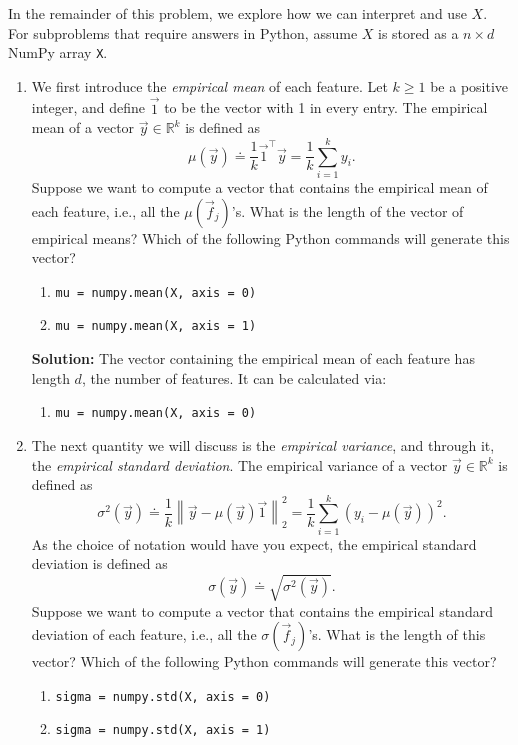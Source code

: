 \documentclass[10pt]{article}
\theoremstyle{definition}
\theoremstyle{plain}
\newcommand{\RR}{\mathbb{R}}
\begin{document}
In the remainder of this problem, we explore how we can interpret and use $X$. For subproblems that require answers in Python, assume $X$ is stored as a $n \times d$ NumPy array \texttt{X}.

\begin{enumerate}[label=(\alph*)]
\item We first introduce the \textit{empirical mean} of each feature. Let $k \geq 1$ be a positive integer, and define $\vec{1}$ to be the vector with 1 in every entry. The empirical mean of a vector $\vec{y} \in \RR^k$ is defined as
\begin{equation}
\mu(\vec{y}) \doteq \frac{1}{k} \vec{1}^\top \vec{y} = \frac{1}{k} \sum_{i=1}^{k} y_i.
\end{equation}
Suppose we want to compute a vector that contains the empirical mean of each feature, i.e., all the $\mu(\vec{f}_j)$'s. What is the length of the vector of empirical means? Which of the following Python commands will generate this vector?
\begin{enumerate}[label=\roman*.]
\item \texttt{mu = numpy.mean(X, axis = 0)}
\item \texttt{mu = numpy.mean(X, axis = 1)}
\end{enumerate}

\textbf{Solution:} The vector containing the empirical mean of each feature has length $d$, the number of features. It can be calculated via:
\begin{enumerate}[label=\roman*.]
\item \texttt{mu = numpy.mean(X, axis = 0)}
\end{enumerate}

\item The next quantity we will discuss is the \textit{empirical variance}, and through it, the \textit{empirical standard deviation}. The empirical variance of a vector $\vec{y} \in \RR^k$ is defined as
\begin{equation}
\sigma^2(\vec{y}) \doteq \frac{1}{k} \left\| \vec{y} - \mu(\vec{y})\vec{1} \right\|_2^2 = \frac{1}{k} \sum_{i=1}^{k} (y_i - \mu(\vec{y}))^2.
\end{equation}
As the choice of notation would have you expect, the empirical standard deviation is defined as
\begin{equation}
\sigma(\vec{y}) \doteq \sqrt{\sigma^2(\vec{y})}.
\end{equation}
Suppose we want to compute a vector that contains the empirical standard deviation of each feature, i.e., all the $\sigma(\vec{f}_j)$'s. What is the length of this vector? Which of the following Python commands will generate this vector?
\begin{enumerate}[label=\roman*.]
\item \texttt{sigma = numpy.std(X, axis = 0)}
\item \texttt{sigma = numpy.std(X, axis = 1)}
\end{enumerate}


\end{enumerate}
\end{document}
